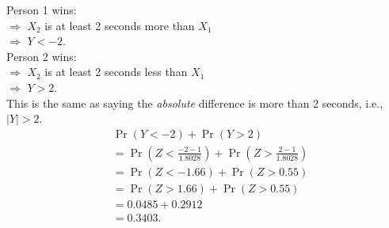 \documentclass[12pt]{article}
\begin{document}
{\begin{minipage}[t]{0.98\textwidth}
\begin{minipage}[t]{0.47\textwidth}
\begin{enumerate}[c)]
        Person 1 wins:\\$\Rightarrow$ $X_2$ is at least 2 seconds more than $X_1$\\$\Rightarrow$ $Y < -2$.\\[0.3cm]
        Person 2 wins:\\$\Rightarrow$ $X_2$ is at least 2 seconds less than $X_1$\\$\Rightarrow$ $Y > 2$.\\[0.3cm]
        This is the same as saying the \emph{absolute} difference is more than 2 seconds, i.e., $|Y| > 2$.
\begin{align*}
&\Pr(Y < - 2) + \Pr(Y > 2)\\
&= \Pr(Z < \tfrac{- 2 - 1}{1.8028}) + \Pr(Z > \tfrac{2 - 1}{1.8028})\\
&= \Pr(Z < -1.66) + \Pr(Z > 0.55)\\
&= \Pr(Z > 1.66) + \Pr(Z > 0.55)\\
&=0.0485 + 0.2912\\
&= 0.3403.
\end{align*}
\end{enumerate}
\end{minipage}
\end{minipage}}\vspace{0.03\textwidth}
\end{document}
